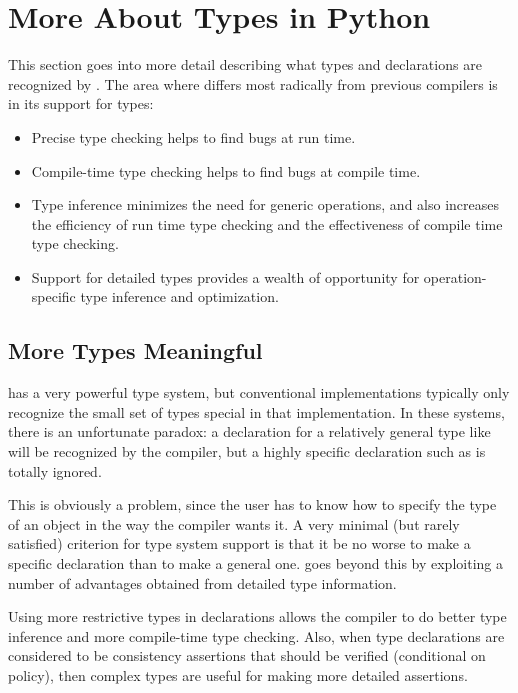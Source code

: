 \section{More About Types in Python}
\label{advanced-type-stuff}

This section goes into more detail describing what types and declarations are
recognized by \python.  The area where \python{} differs most radically from
previous \llisp{} compilers is in its support for types:
\begin{itemize}
  
\item Precise type checking helps to find bugs at run time.
  
\item Compile-time type checking helps to find bugs at compile time.
  
\item Type inference minimizes the need for generic operations, and
  also increases the efficiency of run time type checking and the
  effectiveness of compile time type checking.
  
\item Support for detailed types provides a wealth of opportunity for
  operation-specific type inference and optimization.
\end{itemize}



\subsection{More Types Meaningful}

\clisp{} has a very powerful type system, but conventional \llisp{}
implementations typically only recognize the small set of types
special in that implementation.  In these systems, there is an
unfortunate paradox: a declaration for a relatively general type like
 will be recognized by the compiler, but a highly
specific declaration such as  is totally
ignored.

This is obviously a problem, since the user has to know how to specify
the type of an object in the way the compiler wants it.  A very
minimal (but rarely satisfied) criterion for type system support is
that it be no worse to make a specific declaration than to make a
general one.  \python{} goes beyond this by exploiting a number of
advantages obtained from detailed type information.

Using more restrictive types in declarations allows the compiler to do
better type inference and more compile-time type checking.  Also, when
type declarations are considered to be consistency assertions that
should be verified (conditional on policy), then complex types are
useful for making more detailed assertions.

